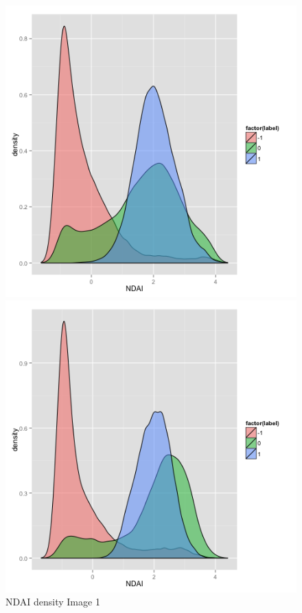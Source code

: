 \documentclass{article}\usepackage[]{graphicx}\usepackage[]{color}
\begin{document}
\begin{figure}[h]
  \includegraphics[width=\linewidth]{NDAI1.png}
  \caption{NDAI density Image 1}\label{}
\endminipage\hfill
{}
  \includegraphics[width=\linewidth]{NDAI2.png}

\end{figure}
\end{document}
